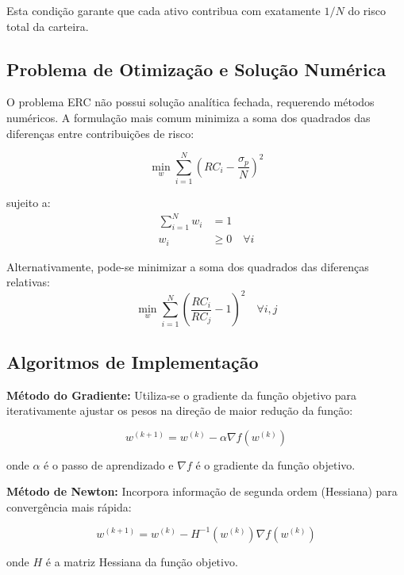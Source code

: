 Esta condição garante que cada ativo contribua com exatamente $1/N$ do risco total da carteira.

\subsection{Problema de Otimização e Solução Numérica}

O problema ERC não possui solução analítica fechada, requerendo métodos numéricos. A formulação mais comum minimiza a soma dos quadrados das diferenças entre contribuições de risco:

\begin{equation}
\min_w \sum_{i=1}^{N} \left(RC_i - \frac{\sigma_p}{N}\right)^2
\end{equation}

sujeito a:
\begin{align}
\sum_{i=1}^{N} w_i &= 1 \\
w_i &\geq 0 \quad \forall i
\end{align}

Alternativamente, pode-se minimizar a soma dos quadrados das diferenças relativas:
\begin{equation}
\min_w \sum_{i=1}^{N} \left(\frac{RC_i}{RC_j} - 1\right)^2 \quad \forall i,j
\end{equation}

\subsection{Algoritmos de Implementação}

\textbf{Método do Gradiente:} Utiliza-se o gradiente da função objetivo para iterativamente ajustar os pesos na direção de maior redução da função:

\begin{equation}
w^{(k+1)} = w^{(k)} - \alpha \nabla f(w^{(k)})
\end{equation}

onde $\alpha$ é o passo de aprendizado e $\nabla f$ é o gradiente da função objetivo.

\textbf{Método de Newton:} Incorpora informação de segunda ordem (Hessiana) para convergência mais rápida:

\begin{equation}
w^{(k+1)} = w^{(k)} - H^{-1}(w^{(k)}) \nabla f(w^{(k)})
\end{equation}

onde $H$ é a matriz Hessiana da função objetivo.

